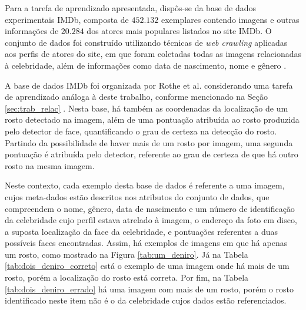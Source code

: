 Para a tarefa de aprendizado apresentada, dispôs-se da base de dados experimentais IMDb, composta de $452.132$ exemplares contendo imagens e outras informações de $20.284$ dos atores mais populares listados no site IMDb. O conjunto de dados foi construído utilizando técnicas de \emph{web crawling} aplicadas aos perfis de atores do site, em que foram coletadas todas as imagens relacionadas à celebridade, além de informações como data de nascimento, nome e gênero \cite{IMDb_derivada}.

A base de dados IMDb foi organizada por Rothe et al. considerando uma tarefa de aprendizado análoga à deste trabalho, conforme mencionado na Seção  \ref{sec:trab_relac} \cite{rothe2015dex}.  Nesta base, há também as coordenadas da localização de um rosto detectado na imagem, além de uma pontuação atribuída ao rosto produzida pelo detector de face, quantificando o grau de certeza na detecção do rosto. Partindo da possibilidade de haver mais de um rosto por imagem, uma segunda pontuação é atribuída pelo detector, referente ao grau de certeza de que há outro rosto na mesma imagem.

Neste contexto, cada exemplo desta base de dados é referente a uma imagem, cujos meta-dados estão descritos nos atributos do conjunto de dados, que compreendem o nome, gênero, data de nascimento e um número de identificação da celebridade cujo perfil estava atrelado à imagem, o endereço da foto em disco, a suposta localização da face da celebridade, e pontuações referentes a duas possíveis faces encontradas. Assim, há exemplos de imagens em que há apenas um rosto, como mostrado na Figura \ref{tab:um_deniro}. Já na Tabela \ref{tab:dois_deniro_correto} está o exemplo de uma imagem onde há mais de um rosto, porém a localização do rosto está correta. Por fim, na Tabela \ref{tab:dois_deniro_errado} há uma imagem com mais de um rosto, porém o rosto identificado neste item não é o da celebridade cujos dados estão referenciados.

